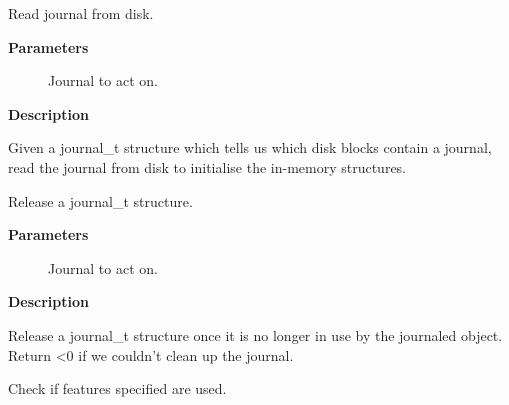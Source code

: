 \documentclass[a4paper,8pt,english]{sphinxmanual}
\begin{document}
\begin{fulllineitems}
\label{filesystems/index:c.jbd2_journal_load}
Read journal from disk.

\end{fulllineitems}


\textbf{Parameters}
\begin{description}
\item[{}] \leavevmode
Journal to act on.

\end{description}

\textbf{Description}

Given a journal\_t structure which tells us which disk blocks contain
a journal, read the journal from disk to initialise the in-memory
structures.

\begin{fulllineitems}
\label{filesystems/index:c.jbd2_journal_destroy}
Release a journal\_t structure.

\end{fulllineitems}


\textbf{Parameters}
\begin{description}
\item[{}] \leavevmode
Journal to act on.

\end{description}

\textbf{Description}

Release a journal\_t structure once it is no longer in use by the
journaled object.
Return \textless{}0 if we couldn't clean up the journal.

\begin{fulllineitems}
\label{filesystems/index:c.jbd2_journal_check_used_features}
Check if features specified are used.

\end{fulllineitems}
\end{document}
